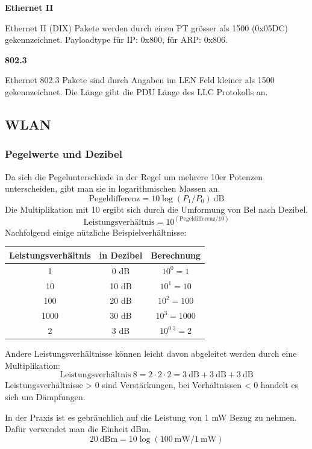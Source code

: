 \textbf{Ethernet II}

Ethernet II (DIX) Pakete werden durch einen PT grösser als 1500
(0x05DC) gekennzeichnet. Payloadtype für IP: 0x800, für ARP: 0x806.

\textbf{802.3}

Ethernet 802.3 Pakete sind durch Angaben im LEN Feld kleiner als 1500
gekennzeichnet. Die Länge gibt die PDU Länge des LLC Protokolls an.


\subsection{WLAN}

\subsubsection{Pegelwerte und Dezibel}

Da sich die Pegelunterschiede in der Regel um mehrere 10er Potenzen unterscheiden,
gibt man sie in logarithmischen Massen an.
\[
	\textrm{Pegeldifferenz} = 10 \log (P_1/P_0)~\textrm{dB}
\]
Die Multiplikation mit 10 ergibt sich durch die Umformung von Bel nach Dezibel.
\[
	\textrm{Leistungsverhältnis} = 10^{(\textrm{Pegeldifferenz}/10)}
\]
Nachfolgend einige nützliche Beispielverhältnisse:

\begin{tabular}{|c|c|c|}
	\hline
	\textbf{Leistungsverhältnis} & \textbf{in Dezibel} & \textbf{Berechnung} \\
	\hline
	1 & 0 dB & $10^0=1$ \\
	\hline
	10 & 10 dB & $10^1=10$ \\
	\hline
	100 & 20 dB & $10^2=100$ \\
	\hline
	1000 & 30 dB & $10^3=1000$ \\
	\hline
	2 & 3 dB & $10^0.3=2$ \\
	\hline
\end{tabular}

Andere Leistungsverhältnisse können leicht davon abgeleitet werden durch eine Multiplikation:
\[
	\textrm{Leistungsverhältnis}~8 = 2 \cdot 2 \cdot 2 = 3~\textrm{dB} + 3~\textrm{dB} + 3~\textrm{dB}
\]
Leistungsverhältnisse > 0 sind Verstärkungen, bei Verhältnissen < 0 handelt es sich um Dämpfungen.

In der Praxis ist es gebräuchlich auf die Leistung von 1 mW Bezug zu nehmen.
Dafür verwendet man die Einheit dBm.
\[
	20~\textrm{dBm} = 10 \log (\SI{100}{\milli\watt}/\SI{1}{\milli\watt})
\]


